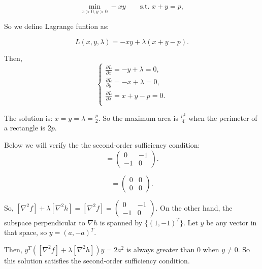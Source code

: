 \documentclass[
  course = {{16-811 Math Fundamentals for Robotics}},
  quartile = {{1}},
  assignment = 4,
  name = {{Kangle Deng}},
  email = {{kangled@andrew.cmu.edu}},
  firstexercise = 1
]{aga-homework}
\begin{document}
\begin{equation*}
    \min \limits_{x>0, y>0} -xy \qquad \text{s.t. } x + y = p,
\end{equation*}

So we define Lagrange funtion as:

\begin{equation*}
    L(x,y,\lambda) = -xy + \lambda(x+y-p).
\end{equation*}

Then,
\begin{equation*}
\left\{
    \begin{aligned}
       \frac{\partial L}{\partial x} = -y + \lambda = 0,\\
       \frac{\partial L}{\partial y} = -x + \lambda = 0,\\
       \frac{\partial L}{\partial \lambda} = x + y -p =0.\\
    \end{aligned}
\right.
\end{equation*}

The solution is: $x = y = \lambda = \frac{p}{2}$. So the maximum area is $\frac{p^2}{4}$ when the perimeter of a rectangle is $2p$.

Below we will verify the the second-order sufficiency condition:
\begin{equation*}
    [\nabla^2 f] = \left(
    \begin{array}{cc}
        0 & -1 \\
        -1 & 0
    \end{array}
    \right).
\end{equation*}

\begin{equation*}
    [\nabla^2 h] = \left(
    \begin{array}{cc}
        0 & 0 \\
        0 & 0
    \end{array}
    \right).
\end{equation*}

So, $[\nabla^2 f] + \lambda [\nabla^2 h] = [\nabla^2 f] = \left(
    \begin{array}{cc}
        0 & -1 \\
        -1 & 0
    \end{array}
    \right)$.
On the other hand, the subspace perpendicular to $\nabla h$ is spanned by $\{(1,-1)^T\}$. Let $y$ be any vector in that space, so $y = (a, -a)^T$.

Then, $y^T([\nabla^2 f] + \lambda [\nabla^2 h])y = 2a^2$ is always greater than 0 when $y \ne 0$. So this solution satisfies the second-order sufficiency condition.
\end{document}
